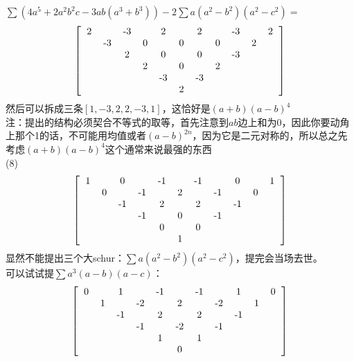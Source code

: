 \documentclass[UTF8]{ctexart}
\begin{document}
$ \displaystyle \sum (4a^{5}+2a^{2}b^{2}c-3ab(a^{3}+b^{3}))-
 2\displaystyle \sum a(a^{2}-b^{2})(a^{2}-c^{2})=$
 \renewcommand*{\arraystretch}{1.732}\[\left[\begin{matrix}
 	\begin{tabular}{ccccccccccccc}
 		2& &-3& &2& &2& &-3& &2\\
 		&-3& &0& &0& &0& &2&\\
 		& &2& &0& &0& &-3& &\\
 		& & &2& &0& &2& & &\\
 		& & & &-3& &-3& & & &\\
 		& & & & &2& & & & &\\
 	\end{tabular}
 \end{matrix}\right]\]
然后可以拆成三条$ [1,-3,2,2,-3,1] $，这恰好是$ (a+b)(a-b)^{4}$\\
注：提出的结构必须契合不等式的取等，首先注意到$ ab $边上和为$ 0 $，因此你要动角上那个1的话，不可能用均值或者$ (a-b)^{2n} $，因为它是二元对称的，所以总之先考虑$ (a+b)(a-b)^{4}$这个通常来说最强的东西\\
(8)\renewcommand*{\arraystretch}{1.732}\[\left[\begin{matrix}
	\begin{tabular}{ccccccccccccc}
		1& &0& &-1& &-1& &0& &1\\
		&0& &-1& &2& &-1& &0&\\
		& &-1& &2& &2& &-1& &\\
		& & &-1& &0& &-1& & &\\
		& & & &0& &0& & & &\\
		& & & & &1& & & & &\\
	\end{tabular}
\end{matrix}\right]\]
显然不能提出三个大schur：$ \displaystyle \sum a(a^{2}-b^{2})(a^{2}-c^{2}) $，提完会当场去世。\\
可以试试提$ \displaystyle \sum a^{3}(a-b)(a-c) $：
\renewcommand*{\arraystretch}{1.732}\[\left[\begin{matrix}
	\begin{tabular}{ccccccccccccc}
		0& &1& &-1& &-1& &1& &0\\
		&1& &-2& &2& &-2& &1&\\
		& &-1& &2& &2& &-1& &\\
		& & &-1& &-2& &-1& & &\\
		& & & &1& &1& & & &\\
		& & & & &0& & & & &\\
	\end{tabular}
\end{matrix}\right]\]
\end{document}
